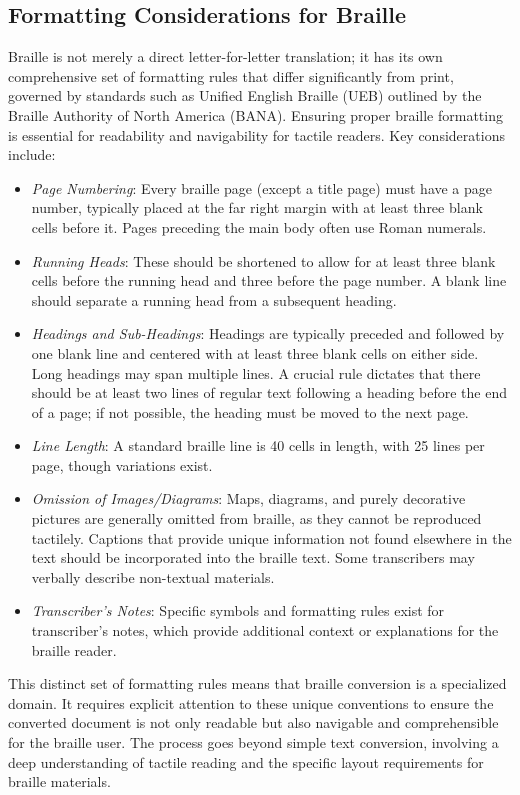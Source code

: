 \subsection{Formatting Considerations for Braille}
Braille is not merely a direct letter-for-letter translation; it has its own comprehensive set of formatting rules that differ significantly from print, governed by standards such as Unified English Braille (UEB) outlined by the Braille Authority of North America (BANA). \cite{ATAEMBrailleFormatting,TextToBraille} Ensuring proper braille formatting is essential for readability and navigability for tactile readers. Key considerations include:
\begin{itemize}
    \item \emph{Page Numbering}: Every braille page (except a title page) must have a page number, typically placed at the far right margin with at least three blank cells before it. \cite{BRLFormat} Pages preceding the main body often use Roman numerals. \cite{BRLFormat}
    \item \emph{Running Heads}: These should be shortened to allow for at least three blank cells before the running head and three before the page number. \cite{BRLFormat} A blank line should separate a running head from a subsequent heading. \cite{BRLFormat}
    \item \emph{Headings and Sub-Headings}: Headings are typically preceded and followed by one blank line and centered with at least three blank cells on either side. \cite{BRLFormat} Long headings may span multiple lines. \cite{BRLFormat} A crucial rule dictates that there should be at least two lines of regular text following a heading before the end of a page; if not possible, the heading must be moved to the next page. \cite{BRLFormat}
    \item \emph{Line Length}: A standard braille line is 40 cells in length, with 25 lines per page, though variations exist. \cite{BRLFormat}
    \item \emph{Omission of Images/Diagrams}: Maps, diagrams, and purely decorative pictures are generally omitted from braille, as they cannot be reproduced tactilely. \cite{BRLFormat} Captions that provide unique information not found elsewhere in the text should be incorporated into the braille text. \cite{BRLFormat} Some transcribers may verbally describe non-textual materials. \cite{BRLFormat}
    \item \emph{Transcriber's Notes}: Specific symbols and formatting rules exist for transcriber's notes, which provide additional context or explanations for the braille reader. \cite{BRLFormat}
\end{itemize}
This distinct set of formatting rules means that braille conversion is a specialized domain. It requires explicit attention to these unique conventions to ensure the converted document is not only readable but also navigable and comprehensible for the braille user. The process goes beyond simple text conversion, involving a deep understanding of tactile reading and the specific layout requirements for braille materials.

